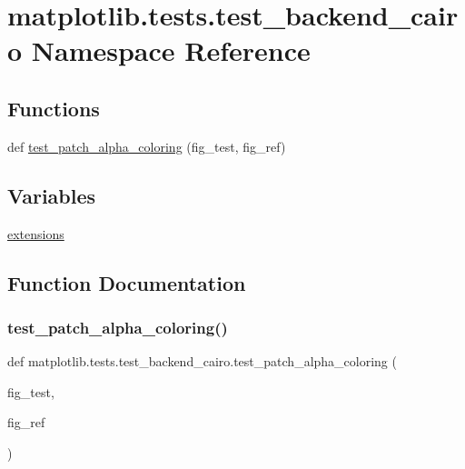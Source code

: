 \hypertarget{namespacematplotlib_1_1tests_1_1test__backend__cairo}{}\section{matplotlib.\+tests.\+test\+\_\+backend\+\_\+cairo Namespace Reference}
\label{namespacematplotlib_1_1tests_1_1test__backend__cairo}
\subsection*{Functions}
\begin{DoxyCompactItemize}
\item 
def \hyperlink{namespacematplotlib_1_1tests_1_1test__backend__cairo_a71bde5c54682b7dd76e6a704be723149}{test\+\_\+patch\+\_\+alpha\+\_\+coloring} (fig\+\_\+test, fig\+\_\+ref)
\end{DoxyCompactItemize}
\subsection*{Variables}
\begin{DoxyCompactItemize}
\item 
\hyperlink{namespacematplotlib_1_1tests_1_1test__backend__cairo_a26df0570f5ee7eae4b5768e372e13f2d}{extensions}
\end{DoxyCompactItemize}


\subsection{Function Documentation}
\mbox{\label{namespacematplotlib_1_1tests_1_1test__backend__cairo_a71bde5c54682b7dd76e6a704be723149}} 
\subsubsection{\texorpdfstring{test\+\_\+patch\+\_\+alpha\+\_\+coloring()}{test\_patch\_alpha\_coloring()}}
{\footnotesize\ttfamily def matplotlib.\+tests.\+test\+\_\+backend\+\_\+cairo.\+test\+\_\+patch\+\_\+alpha\+\_\+coloring (\begin{DoxyParamCaption}\item[{}]{fig\+\_\+test,  }\item[{}]{fig\+\_\+ref }\end{DoxyParamCaption})}

